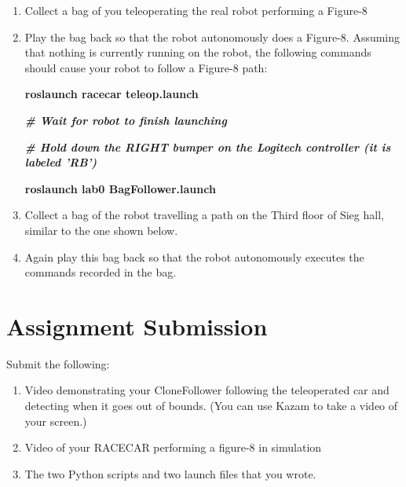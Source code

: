 \documentclass[final]{article}
\begin{document}
\begin{enumerate}

\item Collect a bag of you teleoperating the real robot performing a Figure-8
\item Play the bag back so that the robot autonomously does a Figure-8. Assuming that nothing is currently running on the robot, the following commands should cause your robot to follow a Figure-8 path:\\
    \centerline{\textbf{roslaunch racecar teleop.launch}}
    \centerline{\textbf{\textit{\# Wait for robot to finish launching}}}
    \centerline{\textbf{\textit{\# Hold down the RIGHT bumper on the Logitech controller (it is labeled 'RB')}}}
    \centerline{\textbf{roslaunch lab0 BagFollower.launch}}
\item Collect a bag of the robot travelling a path on the Third floor of Sieg hall, similar to the one shown below.
\item Again play this bag back so that the robot autonomously executes the commands recorded in the bag.

\end{enumerate}


\section{Assignment Submission}

Submit the following:

\begin{enumerate}

\item Video demonstrating your CloneFollower following the teleoperated car and detecting when it goes out of bounds. (You can use Kazam to take a video of your screen.)

\item Video of your RACECAR performing a figure-8 in simulation

\item The two Python scripts and two launch files that you wrote.
\end{enumerate}
\end{document}
